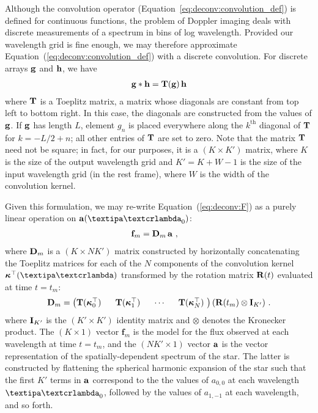 \documentclass[modern]{aastex631}
\begin{document}
Although the convolution operator (Equation~\ref{eq:deconv:convolution_def}) is defined for continuous functions, the problem of Doppler imaging deals with discrete measurements of a spectrum in bins of log wavelength. 
Provided our wavelength grid is fine enough, we may therefore approximate Equation~(\ref{eq:deconv:convolution_def}) with a discrete convolution.
For discrete arrays ${\mathbf{g}}$ and ${\mathbf{h}}$, we have
%
\begin{align}
    \label{eq:linear:convolution_def}
    {\ensuremath{\mathbf{g}}} * {\mathbf{h}} = {\mathbf{T(g)}} \, {\mathbf{h}}
\end{align}
%
where ${\mathbf{T}}$ is a Toeplitz matrix, a matrix whose diagonals are constant from top left to bottom right. 
In this case, the diagonals are constructed from the values of ${\mathbf{g}}$. 
If ${\mathbf{g}}$ has length $L$, element $g_n$ is placed everywhere along the $k^\mathrm{th}$ diagonal of ${\mathbf{T}}$ for $k = -L / 2 + n$; all other entries of ${\mathbf{T}}$ are set to zero. 
Note that the matrix ${\mathbf{T}}$ need not be square; in fact, for our purposes, it is a $(K \times K')$ matrix, where $K$ is the size of the output wavelength grid and $K' = K + W - 1$ is the size of the input wavelength grid (in the rest frame), where $W$ is the width of the convolution kernel.

Given this formulation, we may re-write Equation~(\ref{eq:deconv:F}) as a purely linear operation on $\alm(\lnlam_0)$:
%
\begin{align}
    \label{eq:linear:ft}
    {\ensuremath{\mathbf{f}}}_m
     & =
    {\mathbf{D}}_m
    \,
    {\mathbf{a}}
    \hskip 0.33em,
\end{align}
%
where ${\mathbf{D}}_m$ is a $(K \times N K')$ matrix constructed by horizontally concatenating the Toeplitz matrices for each of the $N$ components of the convolution kernel $\kT(\lnlam)$ transformed by the rotation matrix ${\mathbf{R}}(t)$ evaluated at time $t = t_m$:
%
\begin{align}
    \label{eq:linear:Dm}
    {\ensuremath{\mathbf{D}}}_m =
    \begin{pmatrix}
        {\ensuremath{\mathbf{T}}}(\boldsymbol{\kappa}^\top_0)
        \hskip 0.33em
         &
        \hskip 0.33em
        {\mathbf{T}}(\boldsymbol{\kappa}^\top_1)
        \hskip 0.33em
         &
        \hskip 0.33em
        \cdots
        \hskip 0.33em
         &
        \hskip 0.33em
        {\mathbf{T}}(\boldsymbol{\kappa}^\top_N)
        \hskip 0.33em
    \end{pmatrix}
    ({\mathbf{R}}(t_m) \otimes {\ensuremath{\mathbf{I}}}_{K'})
    \hskip 0.33em.
\end{align}
%
where ${\mathbf{I}}_{K'}$ is the $(K' \times K')$ identity matrix and $\otimes$ denotes the Kronecker product.
%
The $(K \times 1)$ vector $\mathbf{f}_m$ is the model for the flux observed at each wavelength at time $t = t_m$, and the $(N K' \times 1)$ vector ${\mathbf{a}}$ is the vector representation of the spatially-dependent spectrum of the star. 
The latter is constructed by flattening the spherical harmonic expansion of the star such that the first $K'$ terms in ${\mathbf{a}}$ correspond to the the values of $a_{0,0}$ at each wavelength $\lnlam_0$, followed by the values of $a_{1,-1}$ at each wavelength, and so forth.
\end{document}
